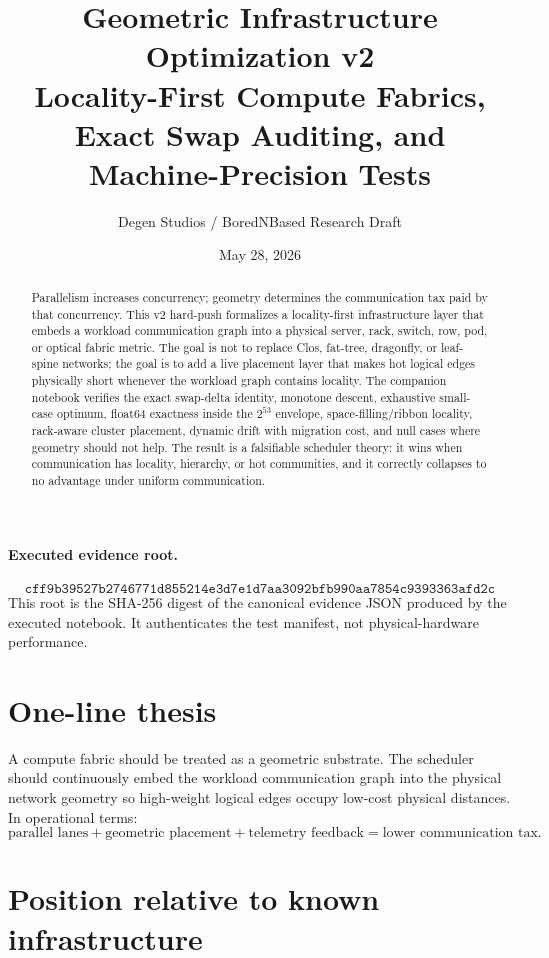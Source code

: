 \documentclass[11pt]{article}
\title{\vspace{-1.0cm}Geometric Infrastructure Optimization v2\\
\large Locality-First Compute Fabrics, Exact Swap Auditing, and Machine-Precision Tests}
\author{Degen Studios / BoredNBased Research Draft}
\date{May 28, 2026}
\theoremstyle{remark}
\begin{document}
\maketitle

\begin{abstract}
Parallelism increases concurrency; geometry determines the communication tax paid by that concurrency. This v2 hard-push formalizes a locality-first infrastructure layer that embeds a workload communication graph into a physical server, rack, switch, row, pod, or optical fabric metric. The goal is not to replace Clos, fat-tree, dragonfly, or leaf-spine networks; the goal is to add a live placement layer that makes hot logical edges physically short whenever the workload graph contains locality. The companion notebook verifies the exact swap-delta identity, monotone descent, exhaustive small-case optimum, float64 exactness inside the $2^{53}$ envelope, space-filling/ribbon locality, rack-aware cluster placement, dynamic drift with migration cost, and null cases where geometry should not help. The result is a falsifiable scheduler theory: it wins when communication has locality, hierarchy, or hot communities, and it correctly collapses to no advantage under uniform communication.
\end{abstract}

\paragraph{Executed evidence root.}
\[
\texttt{cff9b39527b2746771d855214e3d7e1d7aa3092bfb990aa7854c9393363afd2c}
\]
This root is the SHA-256 digest of the canonical evidence JSON produced by the executed notebook. It authenticates the test manifest, not physical-hardware performance.

\section{One-line thesis}

A compute fabric should be treated as a geometric substrate. The scheduler should continuously embed the workload communication graph into the physical network geometry so high-weight logical edges occupy low-cost physical distances. In operational terms:
\[
\text{parallel lanes} + \text{geometric placement} + \text{telemetry feedback} = \text{lower communication tax.}
\]

\section{Position relative to known infrastructure}
\end{document}
